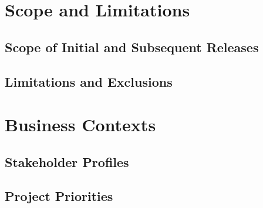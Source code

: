 \documentclass[11pt,letterpaper,rotate]{article}
\begin{document}

\section{Scope and Limitations}


\subsection{Scope of Initial and Subsequent Releases}


\subsection{Limitations and Exclusions}


\section{Business Contexts}


\subsection{Stakeholder Profiles}


\subsection{Project Priorities}

\end{document}
